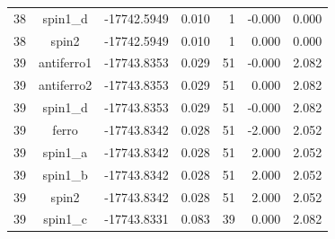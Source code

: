 \begin{longtable}{@{}ccrrrrr@{}}
38 & spin1\_d & -17742.5949 & 0.010 & 1 & -0.000 & 0.000 \\
38 & spin2 & -17742.5949 & 0.010 & 1 & 0.000 & 0.000 \\
\rowcolor{gray!20} 39 & antiferro1 & -17743.8353 & 0.029 & 51 & -0.000 & 2.082 \\
39 & antiferro2 & -17743.8353 & 0.029 & 51 & 0.000 & 2.082 \\
39 & spin1\_d & -17743.8353 & 0.029 & 51 & -0.000 & 2.082 \\
39 & ferro & -17743.8342 & 0.028 & 51 & -2.000 & 2.052 \\
39 & spin1\_a & -17743.8342 & 0.028 & 51 & 2.000 & 2.052 \\
39 & spin1\_b & -17743.8342 & 0.028 & 51 & 2.000 & 2.052 \\
39 & spin2 & -17743.8342 & 0.028 & 51 & 2.000 & 2.052 \\
39 & spin1\_c & -17743.8331 & 0.083 & 39 & 0.000 & 2.082 \\
\end{longtable}